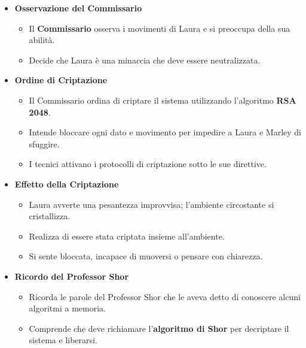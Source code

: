 \begin{itemize}
    \item \textbf{Osservazione del Commissario}
    \begin{itemize}
        \item Il \textbf{Commissario} osserva i movimenti di Laura e si preoccupa della sua abilità.
        \item Decide che Laura è una minaccia che deve essere neutralizzata.
    \end{itemize}
    \item \textbf{Ordine di Criptazione}
    \begin{itemize}
        \item Il Commissario ordina di criptare il sistema utilizzando l'algoritmo \textbf{RSA 2048}.
        \item Intende bloccare ogni dato e movimento per impedire a Laura e Marley di sfuggire.
        \item I tecnici attivano i protocolli di criptazione sotto le sue direttive.
    \end{itemize}
\end{itemize}


\begin{itemize}
    \item \textbf{Effetto della Criptazione}
    \begin{itemize}
        \item Laura avverte una pesantezza improvvisa; l'ambiente circostante si cristallizza.
        \item Realizza di essere stata criptata insieme all'ambiente.
        \item Si sente bloccata, incapace di muoversi o pensare con chiarezza.
    \end{itemize}
    \item \textbf{Ricordo del Professor Shor}
    \begin{itemize}
        \item Ricorda le parole del Professor Shor che le aveva detto di conoscere alcuni algoritmi a memoria.
        \item Comprende che deve richiamare l'\textbf{algoritmo di Shor} per decriptare il sistema e liberarsi.
    \end{itemize}
\end{itemize}

